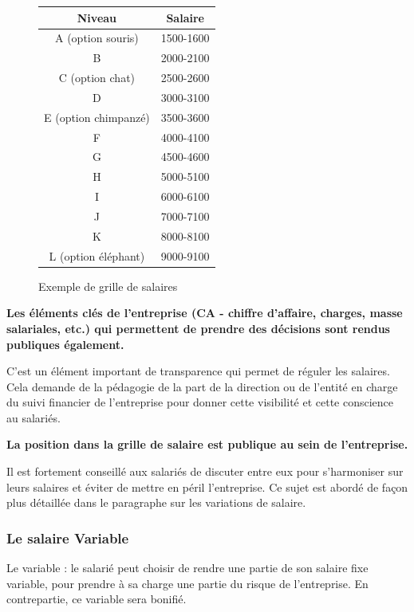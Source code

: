 \documentclass[12pt]{article}
\newcommand{\regle}[1]{%
  \begin{tcolorbox}[colframe=DarkOrange,boxrule=2pt,arc=4pt,left=6pt,right=6pt,top=6pt,bottom=6pt,boxsep=0pt,colback=LightOrange]
  \textbf{#1}
  \end{tcolorbox}
}
\begin{document}
\begin{figure}
  \begin{center}
  \begin{tabular}{| c | c |}
    \hline
    Niveau & Salaire \\ 
    \hline
    A (option souris) & 1500-1600 \\
    \hline
    B & 2000-2100 \\
    \hline
    C (option chat) & 2500-2600 \\
    \hline
    D & 3000-3100 \\
    \hline
    E (option chimpanzé) & 3500-3600 \\
    \hline
    F & 4000-4100 \\
    \hline
    G & 4500-4600 \\
    \hline
    H & 5000-5100 \\
    \hline
    I & 6000-6100 \\
    \hline
    J & 7000-7100 \\
    \hline
    K & 8000-8100 \\
    \hline
    L (option éléphant) & 9000-9100 \\
    \hline
  \end{tabular}
  \end{center}
  \caption{Exemple de grille de salaires}
  \label{grille}
\end{figure}

\regle{Les éléments clés de l’entreprise (CA - chiffre d’affaire, charges, masse salariales, etc.) qui permettent de prendre des décisions sont rendus publiques également.}

 C’est un élément important de transparence qui permet de réguler les salaires. Cela demande de la pédagogie de la part de la direction ou de l’entité en charge du suivi financier de l’entreprise pour donner cette visibilité et cette conscience au salariés.

 \regle{La position dans la grille de salaire est publique au sein de l’entreprise.}

 Il est fortement conseillé aux salariés de discuter entre eux pour s’harmoniser sur leurs salaires et éviter de mettre en péril l’entreprise. Ce sujet est abordé de façon plus détaillée dans le paragraphe sur les variations de salaire.

 \subsubsection{Le salaire Variable}
 Le variable : le salarié peut choisir de rendre une partie de son salaire fixe variable, pour prendre à sa charge une partie du risque de l’entreprise. En contrepartie, ce variable sera bonifié. 
\end{document}
